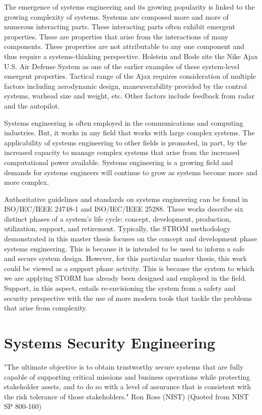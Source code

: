 \documentclass[../../main/main.tex]{subfiles}
\begin{document}
The emergence of systems engineering and its growing popularity is linked to the growing complexity of systems.  Systems are composed more and more of numerous interacting parts.  These interacting parts often exhibit emergent properties.  These are properties that arise from the interactions of many components.  These properties are not attributable to any one component and thus require a systems-thinking perspective. Holstein and Bode site the Nike Ajax U.S. Air Defense System as one of the earlier examples of these system-level emergent properties. Tactical range of the Ajax requires consideration of multiple factors including aerodynamic design, maneuverability provided by the control systems, warhead size and weight, etc.  Other factors include feedback from radar and the autopilot.

Systems engineering is often employed in the communications and computing industries. But, it works in any field that works with large complex systems.  The applicability of systems engineering to other fields is promoted, in part, by the increased capacity to manage complex systems that arise from the increased computational power available.  Systems engineering is a growing field and demands for systems engineers will continue to grow as systems become more and more complex.

Authoritative guidelines and standards on systems engineering can be found in ISO/IEC/IEEE 24748-1 and ISO/IEC/IEEE 25288.  These works describe six distinct phases of a system's life cycle: concept, development, production, utilization, support, and retirement.  Typically, the STROM methodology demonstrated in this master thesis focuses on the concept and development phase systems engineering. This is because it is intended to be used to inform a safe and secure system design.  However, for this particular master thesis, this work could be viewed as a support phase activity. This is because the system to which we are applying STORM has already been designed and employed in the field.   Support, in this aspect, entails re-envisioning the system from a safety and security perspective with the use of more modern tools that tackle the problems that arise from complexity.
\section{Systems Security Engineering}\label{sesc:sse}
"The ultimate objective is to obtain trustworthy secure systems that are fully capable of supporting critical missions and business operations while protecting stakeholder assets, and to do so with a level of assurance that is consistent with the risk tolerance of those stakeholders."
Ron Ross (NIST) (Quoted from NIST SP 800-160)
\end{document}
